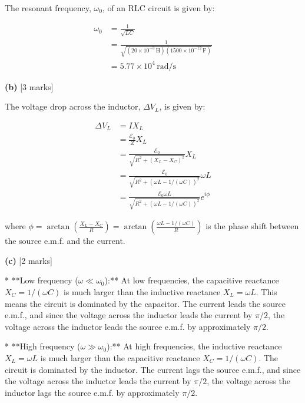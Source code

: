 \documentclass{article}
\begin{document}
The resonant frequency, $\omega_0$, of an RLC circuit is given by:

\begin{align*}
\omega_0 &= \frac{1}{\sqrt{LC}} \\
&= \frac{1}{\sqrt{(20 \times 10^{-3}\,\mathrm{H})(1500 \times 10^{-12}\,\mathrm{F})}} \\
&= 5.77 \times 10^4\,\mathrm{rad/s}
\end{align*}

\textbf{(b)} [3 marks]

The voltage drop across the inductor, $\Delta V_L$, is given by:

\begin{align*}
\Delta V_L &= I X_L \\
&= \frac{\mathcal{E}_0}{Z} X_L \\
&= \frac{\mathcal{E}_0}{\sqrt{R^2 + (X_L - X_C)^2}} X_L \\
&= \frac{\mathcal{E}_0}{\sqrt{R^2 + (\omega L - 1/(\omega C))^2}} \omega L \\
&= \frac{\mathcal{E}_0 \omega L}{\sqrt{R^2 + (\omega L - 1/(\omega C))^2}}  e^{i \phi}
\end{align*}

where $\phi = \arctan \left( \frac{X_L - X_C}{R} \right) =  \arctan \left( \frac{\omega L - 1/(\omega C)}{R} \right)$ is the phase shift between the source e.m.f. and the current.

\textbf{(c)} [2 marks]

* **Low frequency ($\omega \ll \omega_0$):**  At low frequencies, the capacitive reactance $X_C = 1/(\omega C)$ is much larger than the inductive reactance $X_L = \omega L$. This means the circuit is dominated by the capacitor. The current leads the source e.m.f., and since the voltage across the inductor leads the current by $\pi/2$,  the voltage across the inductor leads the source e.m.f. by approximately $\pi/2$.

* **High frequency ($\omega \gg \omega_0$):** At high frequencies, the inductive reactance $X_L = \omega L$ is much larger than the capacitive reactance $X_C = 1/(\omega C)$. The circuit is dominated by the inductor. The current lags the source e.m.f., and since the voltage across the inductor leads the current by $\pi/2$, the voltage across the inductor lags the source e.m.f. by approximately $\pi/2$. 
\end{document}
